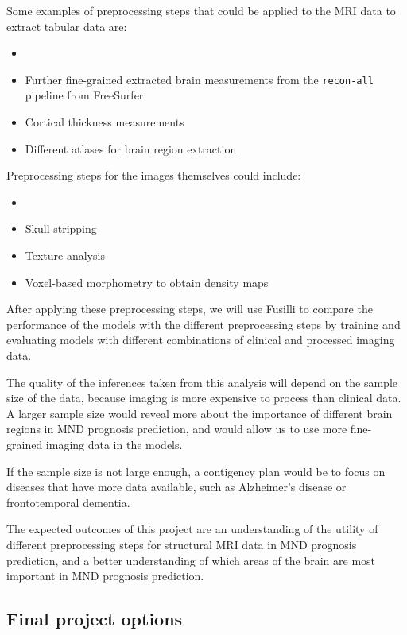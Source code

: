 Some examples of preprocessing steps that could be applied to the MRI data to extract tabular data are:
\begin{itemize}
\item \setlength\itemsep{-0.5em}
    \item Further fine-grained extracted brain measurements from the \texttt{recon-all} pipeline from FreeSurfer
    \item Cortical thickness measurements
    \item Different atlases for brain region extraction
\end{itemize}

Preprocessing steps for the images themselves could include:
\begin{itemize}
\item \setlength\itemsep{-0.5em}
    \item Skull stripping
    \item Texture analysis
    \item Voxel-based morphometry to obtain density maps
\end{itemize}

After applying these preprocessing steps, we will use Fusilli to compare the performance of the models with the different preprocessing steps by training and evaluating models with different combinations of clinical and processed imaging data.

The quality of the inferences taken from this analysis will depend on the sample size of the data, because imaging is more expensive to process than clinical data.
A larger sample size would reveal more about the importance of different brain regions in MND prognosis prediction, and would allow us to use more fine-grained imaging data in the models.

If the sample size is not large enough, a contigency plan would be to focus on diseases that have more data available, such as Alzheimer's disease or frontotemporal dementia.

The expected outcomes of this project are an understanding of the utility of different preprocessing steps for structural MRI data in MND prognosis prediction, and a better understanding of which areas of the brain are most important in MND prognosis prediction.


\subsection{Final project options}

